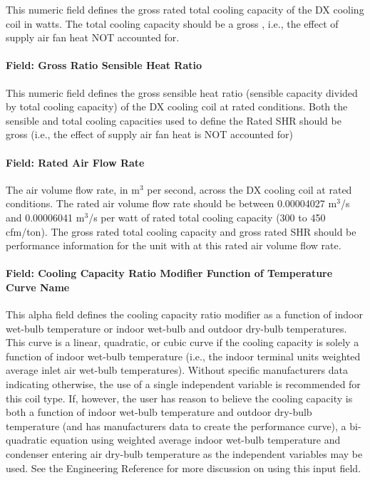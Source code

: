 This numeric field defines the gross rated total cooling capacity of the DX cooling coil in watts. The total cooling capacity should be a gross , i.e., the effect of supply air fan heat NOT accounted for.

\paragraph{Field: Gross Ratio Sensible Heat Ratio}\label{field-gross-ratio-sensible-heat-ratio}

This numeric field defines the gross sensible heat ratio (sensible capacity divided by total cooling capacity) of the DX cooling coil at rated conditions. Both the sensible and total cooling capacities used to define the Rated SHR should be gross (i.e., the effect of supply air fan heat is NOT accounted for)

\paragraph{Field: Rated Air Flow Rate}\label{field-rated-air-flow-rate}

The air volume flow rate, in m\(^{3}\) per second, across the DX cooling coil at rated conditions. The rated air volume flow rate should be between 0.00004027 m\(^{3}\)/s and 0.00006041 m\(^{3}\)/s per watt of rated total cooling capacity (300 to 450 cfm/ton). The gross rated total cooling capacity and gross rated SHR should be performance information for the unit with at this rated air volume flow rate.

\paragraph{Field: Cooling Capacity Ratio Modifier Function of Temperature Curve Name}\label{field-cooling-capacity-ratio-modifier-function-of-temperature-curve-name}

This alpha field defines the cooling capacity ratio modifier as a function of indoor wet-bulb temperature or indoor wet-bulb and outdoor dry-bulb temperatures. This curve is a linear, quadratic, or cubic curve if the cooling capacity is solely a function of indoor wet-bulb temperature (i.e., the indoor terminal units weighted average inlet air wet-bulb temperatures). Without specific manufacturers data indicating otherwise, the use of a single independent variable is recommended for this coil type. If, however, the user has reason to believe the cooling capacity is both a function of indoor wet-bulb temperature and outdoor dry-bulb temperature (and has manufacturers data to create the performance curve), a bi-quadratic equation using weighted average indoor wet-bulb temperature and condenser entering air dry-bulb temperature as the independent variables may be used. See the Engineering Reference for more discussion on using this input field.

